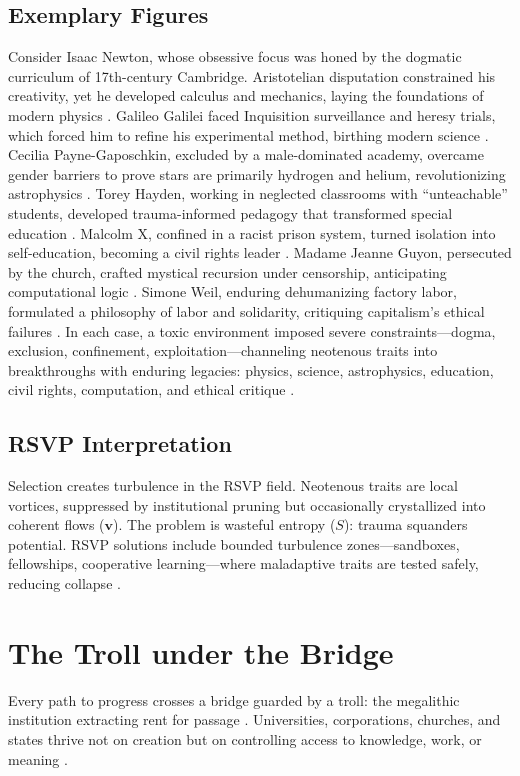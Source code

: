 \documentclass[12pt]{article}
\begin{document}
\subsection{Exemplary Figures}
Consider Isaac Newton, whose obsessive focus was honed by the dogmatic curriculum of 17th-century Cambridge. Aristotelian disputation constrained his creativity, yet he developed calculus and mechanics, laying the foundations of modern physics \citep{koyre1957closed}. Galileo Galilei faced Inquisition surveillance and heresy trials, which forced him to refine his experimental method, birthing modern science \citep{koyre1957closed}. Cecilia Payne-Gaposchkin, excluded by a male-dominated academy, overcame gender barriers to prove stars are primarily hydrogen and helium, revolutionizing astrophysics \citep{payne1930stars}. Torey Hayden, working in neglected classrooms with “unteachable” students, developed trauma-informed pedagogy that transformed special education \citep{hayden1980one}. Malcolm X, confined in a racist prison system, turned isolation into self-education, becoming a civil rights leader \citep{malcolmx1965}. Madame Jeanne Guyon, persecuted by the church, crafted mystical recursion under censorship, anticipating computational logic \citep{guyon1897autobiography}. Simone Weil, enduring dehumanizing factory labor, formulated a philosophy of labor and solidarity, critiquing capitalism’s ethical failures \citep{weil1958oppression}. In each case, a toxic environment imposed severe constraints—dogma, exclusion, confinement, exploitation—channeling neotenous traits into breakthroughs with enduring legacies: physics, science, astrophysics, education, civil rights, computation, and ethical critique \citep{henrich2016secret}.

\subsection{RSVP Interpretation}
Selection creates turbulence in the RSVP field. Neotenous traits are local vortices, suppressed by institutional pruning but occasionally crystallized into coherent flows ($\mathbf{v}$). The problem is wasteful entropy ($S$): trauma squanders potential. RSVP solutions include bounded turbulence zones—sandboxes, fellowships, cooperative learning—where maladaptive traits are tested safely, reducing collapse \citep{strugatsky2016doomed}.

\section{The Troll under the Bridge}
Every path to progress crosses a bridge guarded by a troll: the megalithic institution extracting rent for passage \citep{giblin2022chokepoint}. Universities, corporations, churches, and states thrive not on creation but on controlling access to knowledge, work, or meaning \citep{zuboff2019age}.
\end{document}
